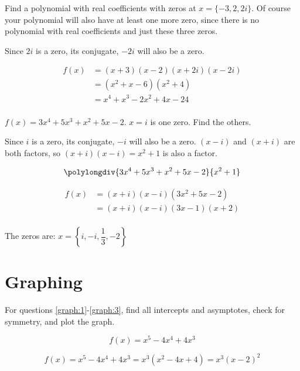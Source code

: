 \documentclass[fleqn,addpoints]{exam}
\begin{document}
\begin{questions}
\question[10]
Find a polynomial with real coefficients with zeros at $x = \{ -3, 2, 2i \}$.  Of course your polynomial will also have at
least one more zero, since there is no polynomial with real coefficients and just these three zeros.

\begin{solution}[8 cm]

Since $2i$ is a zero, its conjugate, $-2i$ will also be a zero.

\begin{align*}
  f(x) &= (x+3)(x-2)(x+2i)(x-2i) \\ 
    &= (x^2+x-6)(x^2+4) \\ 
    &= x^4 + x^3 - 2x^2 + 4x - 24 \\ 
\end{align*}

\end{solution}

\ifprintanswers
\pagebreak
\fi

\question[10]
$f(x) = 3x^4 + 5x^3 + x^2 + 5x - 2$.  $x = i$ is one zero.  Find the others.

\begin{solution}[7 cm]
Since $i$ is a zero, its conjugate, $-i$ will also be a zero.  $(x-i)$ and $(x+i)$ are both factors, so $(x+i)(x-i) =
x^2+1$ is also a factor.

\[ 
  \polylongdiv{3x^4 + 5x^3 + x^2 + 5x - 2}{x^2+1}
\]

\begin{align*}
  f(x) &= (x+i)(x-i)(3x^2+5x-2) \\
  &= (x+i)(x-i)(3x-1)(x+2) \\
\end{align*}

The zeros are: $x = \left \{ i, -i, \dfrac{1}{3}, -2 \right \}$

\end{solution}

\pagebreak

\section{Graphing}
For questions \ref{graph:1}-\ref{graph:3}, find all intercepts and asymptotes, check for
symmetry, and plot the graph.

\question[10]
\label{graph:1}
\[
  f(x) = x^5 - 4x^4 + 4x^3
\]

\begin{solution}[6 cm]
\[
  f(x) = x^5 - 4x^4 + 4x^3 = x^3(x^2 - 4x + 4) = x^3(x-2)^2
\]


\end{solution}
\end{questions}
\end{document}
